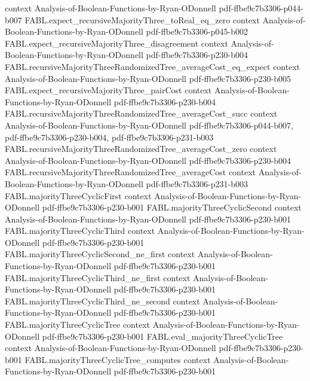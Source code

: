 \begin{theorem}
  {context}
  {Analysis-of-Boolean-Functions-by-Ryan-ODonnell}
  {pdf-ffbe9c7b3306-p044-b007}
\proofstep
  {FABL.expect_recursiveMajorityThree_toReal_eq_zero}
  {context}
  {Analysis-of-Boolean-Functions-by-Ryan-ODonnell}
  {pdf-ffbe9c7b3306-p045-b002}
\proofstep
  {FABL.expect_recursiveMajorityThree_disagreement}
  {context}
  {Analysis-of-Boolean-Functions-by-Ryan-ODonnell}
  {pdf-ffbe9c7b3306-p230-b004}
\proofstep
  {FABL.recursiveMajorityThreeRandomizedTree_averageCost_eq_expect}
  {context}
  {Analysis-of-Boolean-Functions-by-Ryan-ODonnell}
  {pdf-ffbe9c7b3306-p230-b005}
\proofstep
  {FABL.expect_recursiveMajorityThree_pairCost}
  {context}
  {Analysis-of-Boolean-Functions-by-Ryan-ODonnell}
  {pdf-ffbe9c7b3306-p230-b004}
\proofstep
  {FABL.recursiveMajorityThreeRandomizedTree_averageCost_succ}
  {context}
  {Analysis-of-Boolean-Functions-by-Ryan-ODonnell}
  {pdf-ffbe9c7b3306-p044-b007,
    pdf-ffbe9c7b3306-p230-b004,
    pdf-ffbe9c7b3306-p231-b003}
\proofstep
  {FABL.recursiveMajorityThreeRandomizedTree_averageCost_zero}
  {context}
  {Analysis-of-Boolean-Functions-by-Ryan-ODonnell}
  {pdf-ffbe9c7b3306-p230-b004}
\proofstep
  {FABL.recursiveMajorityThreeRandomizedTree_averageCost}
  {context}
  {Analysis-of-Boolean-Functions-by-Ryan-ODonnell}
  {pdf-ffbe9c7b3306-p231-b003}
\proofstep
  {FABL.majorityThreeCyclicFirst}
  {context}
  {Analysis-of-Boolean-Functions-by-Ryan-ODonnell}
  {pdf-ffbe9c7b3306-p230-b001}
\proofstep
  {FABL.majorityThreeCyclicSecond}
  {context}
  {Analysis-of-Boolean-Functions-by-Ryan-ODonnell}
  {pdf-ffbe9c7b3306-p230-b001}
\proofstep
  {FABL.majorityThreeCyclicThird}
  {context}
  {Analysis-of-Boolean-Functions-by-Ryan-ODonnell}
  {pdf-ffbe9c7b3306-p230-b001}
\proofstep
  {FABL.majorityThreeCyclicSecond_ne_first}
  {context}
  {Analysis-of-Boolean-Functions-by-Ryan-ODonnell}
  {pdf-ffbe9c7b3306-p230-b001}
\proofstep
  {FABL.majorityThreeCyclicThird_ne_first}
  {context}
  {Analysis-of-Boolean-Functions-by-Ryan-ODonnell}
  {pdf-ffbe9c7b3306-p230-b001}
\proofstep
  {FABL.majorityThreeCyclicThird_ne_second}
  {context}
  {Analysis-of-Boolean-Functions-by-Ryan-ODonnell}
  {pdf-ffbe9c7b3306-p230-b001}
\proofstep
  {FABL.majorityThreeCyclicTree}
  {context}
  {Analysis-of-Boolean-Functions-by-Ryan-ODonnell}
  {pdf-ffbe9c7b3306-p230-b001}
\proofstep
  {FABL.eval_majorityThreeCyclicTree}
  {context}
  {Analysis-of-Boolean-Functions-by-Ryan-ODonnell}
  {pdf-ffbe9c7b3306-p230-b001}
\proofstep
  {FABL.majorityThreeCyclicTree_computes}
  {context}
  {Analysis-of-Boolean-Functions-by-Ryan-ODonnell}
  {pdf-ffbe9c7b3306-p230-b001}
\proofstep

\end{theorem}
